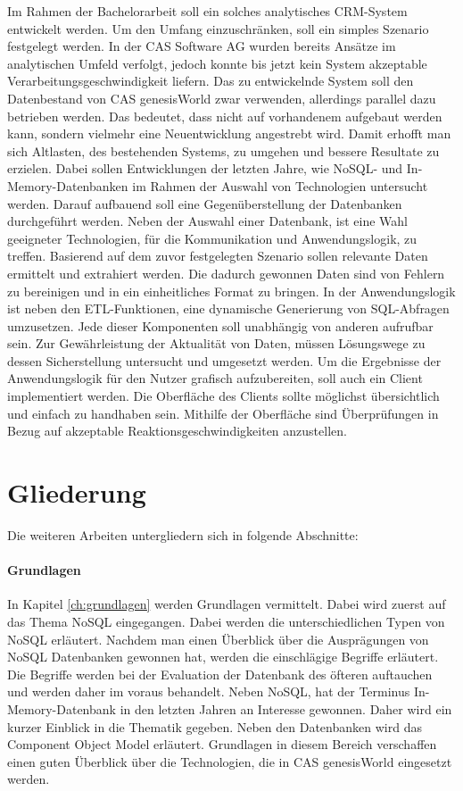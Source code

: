 Im Rahmen der Bachelorarbeit soll ein solches analytisches CRM-System entwickelt werden. Um den Umfang einzuschränken, soll ein simples Szenario festgelegt werden. In der CAS Software AG wurden bereits Ansätze im analytischen Umfeld verfolgt, jedoch konnte bis jetzt kein System akzeptable Verarbeitungsgeschwindigkeit liefern. Das zu entwickelnde System soll den Datenbestand von CAS genesisWorld zwar verwenden, allerdings parallel dazu betrieben werden. Das bedeutet, dass nicht auf vorhandenem aufgebaut werden kann, sondern vielmehr eine Neuentwicklung angestrebt wird. Damit erhofft man sich Altlasten, des bestehenden Systems, zu umgehen und bessere Resultate zu erzielen. Dabei sollen Entwicklungen der letzten Jahre, wie NoSQL- und In-Memory-Datenbanken im Rahmen der Auswahl von Technologien untersucht werden. Darauf aufbauend soll eine Gegenüberstellung der Datenbanken durchgeführt werden. Neben der Auswahl einer Datenbank, ist eine Wahl geeigneter Technologien, für die Kommunikation und Anwendungslogik, zu treffen. Basierend auf dem zuvor festgelegten Szenario sollen relevante Daten ermittelt und extrahiert werden. Die dadurch gewonnen Daten sind von Fehlern zu bereinigen und in ein einheitliches Format zu bringen.
In der Anwendungslogik ist neben den ETL-Funktionen, eine dynamische Generierung von SQL-Abfragen umzusetzen. Jede dieser Komponenten soll unabhängig von anderen aufrufbar sein. Zur Gewährleistung der Aktualität von Daten, müssen Lösungswege zu dessen Sicherstellung untersucht und umgesetzt werden. Um die Ergebnisse der Anwendungslogik für den Nutzer grafisch aufzubereiten, soll auch ein Client implementiert werden. Die Oberfläche des Clients sollte möglichst übersichtlich und einfach zu handhaben sein. Mithilfe der Oberfläche sind Überprüfungen in Bezug auf akzeptable Reaktionsgeschwindigkeiten anzustellen. 

\section{Gliederung}
\label{ch:Einfuehrung:sec:Gliederung}

Die weiteren Arbeiten untergliedern sich in folgende Abschnitte: 
 
\paragraph{Grundlagen} In Kapitel \ref{ch:grundlagen} werden Grundlagen vermittelt. Dabei wird zuerst auf das Thema NoSQL eingegangen. Dabei werden die unterschiedlichen Typen von NoSQL erläutert. Nachdem man einen Überblick über die Ausprägungen von NoSQL Datenbanken gewonnen hat, werden die einschlägige Begriffe erläutert. Die Begriffe werden bei der Evaluation der Datenbank des öfteren auftauchen und werden daher im voraus behandelt. Neben NoSQL, hat der Terminus In-Memory-Datenbank in den letzten Jahren an Interesse gewonnen. Daher wird ein kurzer Einblick in die Thematik gegeben. Neben den Datenbanken wird das Component Object Model erläutert. Grundlagen in diesem Bereich verschaffen einen guten Überblick über die Technologien, die in CAS genesisWorld eingesetzt werden. 

